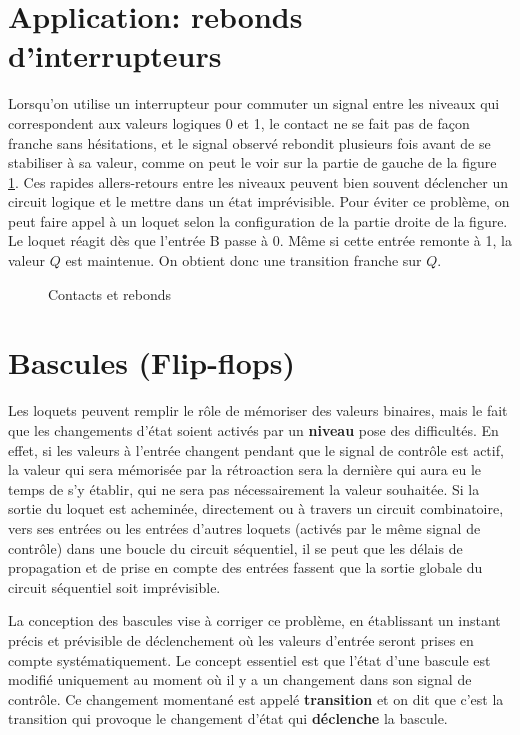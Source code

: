\documentclass[letter, oneside]{book}
\begin{document}
\section{Application: rebonds d'interrupteurs}
\label{sec:org2d17205}

Lorsqu'on utilise un interrupteur pour commuter un signal entre les
niveaux qui correspondent aux valeurs logiques 0 et 1, le contact ne
se fait pas de façon franche sans hésitations, et le signal observé
rebondit plusieurs fois avant de se stabiliser à sa valeur, comme on
peut le voir sur la partie de gauche de la figure \ref{fig:org3befd25}. Ces
rapides allers-retours entre les niveaux peuvent bien souvent
déclencher un circuit logique et le mettre dans un état
imprévisible. Pour éviter ce problème, on peut faire appel à un loquet
selon la configuration de la partie droite de la figure. Le loquet
réagit dès que l'entrée B passe à 0. Même si cette entrée remonte à 1,
la valeur \(Q\) est maintenue. On obtient donc une transition franche sur
\(Q\).

\begin{figure}[htbp]
\centering

\caption{\label{fig:org3befd25}Contacts et rebonds}
\end{figure}

\section{Bascules (Flip-flops)}
\label{sec:org06864b3}

Les loquets peuvent remplir le rôle de mémoriser des valeurs binaires,
mais le fait que les changements d'état soient activés par un \textbf{niveau}
pose des difficultés. En effet, si les valeurs à l'entrée changent
pendant que le signal de contrôle est actif, la valeur qui sera
mémorisée par la rétroaction sera la dernière qui aura eu le temps de
s'y établir, qui ne sera pas nécessairement la valeur souhaitée. Si la
sortie du loquet est acheminée, directement ou à travers un circuit
combinatoire, vers ses entrées ou les entrées d'autres loquets
(activés par le même signal de contrôle) dans une boucle du circuit
séquentiel, il se peut que les délais de propagation et de prise en
compte des entrées fassent que la sortie globale du circuit séquentiel
soit imprévisible.

La conception des bascules vise à corriger ce problème, en établissant
un instant précis et prévisible de déclenchement où les valeurs
d'entrée seront prises en compte systématiquement. Le concept
essentiel est que l'état d'une bascule est modifié uniquement au
moment où il y a un changement dans son signal de contrôle. Ce
changement momentané est appelé \textbf{transition} et on dit que c'est la
transition qui provoque le changement d'état qui \textbf{déclenche} la
bascule.
\end{document}
